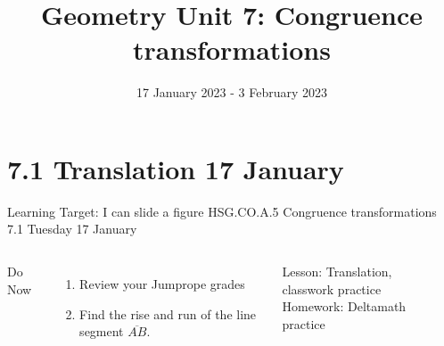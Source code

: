 

\newcommand\ticks{}
  \def\ticks{{Bar[scale=2]}-{Bar[scale=2]}}
\newcommand\paraticks{}
  \def\paraticks{{Straight Barb[reversed, scale=2]}-{Straight Barb[scale=2]}}

\title{Geometry Unit 7: Congruence transformations}
\date{17 January 2023 - 3 February 2023}


\frame{\titlepage}
\section[Outline]{}
\frame{\tableofcontents}

\section{7.1 Translation \hfill 17 January \,}
\begin{frame}{Learning Target: I can slide a figure}
  {HSG.CO.A.5 Congruence transformations \hfill \alert{7.1 Tuesday 17 January}}
  \begin{columns}
    Do Now
    \begin{enumerate}
      \item Review your Jumprope grades
      \item Find the rise and run of the line segment $\overline{AB}$.
    \end{enumerate}
    Lesson: Translation, classwork practice \\
    Homework: Deltamath practice
    \begin{flushright}
    \end{flushright}
  \end{columns}
\end{frame}

